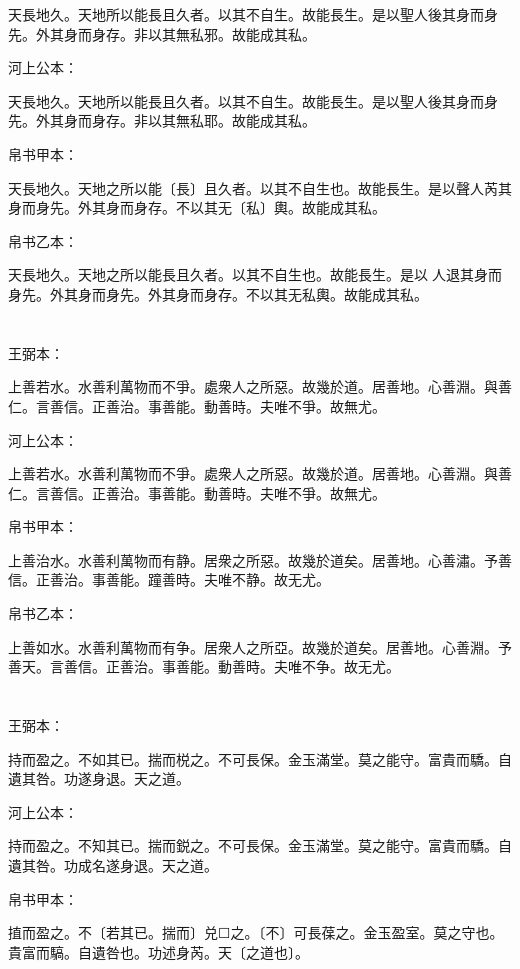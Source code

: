 \documentclass[a5paper]{ctexbook}
\begin{document}
    天長地久。天地所以能長且久者。以其不自生。故能長生。是以聖人後其身而身先。外其身而身存。非以其無私邪。故能成其私。

    河上公本：

    天長地久。天地所以能長且久者。以其不自生。故能長生。是以聖人後其身而身先。外其身而身存。非以其無私耶。故能成其私。

    帛书甲本：

    天長地久。天地之所以能〔長〕且久者。以其不自生也。故能長生。是以聲人芮其身而身先。外其身而身存。不以其无〔私〕輿。故能成其私。

    帛书乙本：

    天長地久。天地之所以能長且久者。以其不自生也。故能長生。是以𦔻人退其身而身先。外其身而身先。外其身而身存。不以其无私輿。故能成其私。

    \chapter{}
    王弼本：

    上善若水。水善利萬物而不爭。處衆人之所惡。故幾於道。居善地。心善淵。與善仁。言善信。正善治。事善能。動善時。夫唯不爭。故無尤。

    河上公本：

    上善若水。水善利萬物而不爭。處衆人之所惡。故幾於道。居善地。心善淵。與善仁。言善信。正善治。事善能。動善時。夫唯不爭。故無尤。

    帛书甲本：

    上善治水。水善利萬物而有静。居衆之所惡。故幾於道矣。居善地。心善潚。予善信。正善治。事善能。蹱善時。夫唯不静。故无尤。

    帛书乙本：

    上善如水。水善利萬物而有争。居衆人之所亞。故幾於道矣。居善地。心善淵。予善天。言善信。正善治。事善能。動善時。夫唯不争。故无尤。

    \chapter{}
    王弼本：

    持而盈之。不如其已。揣而棁之。不可長保。金玉滿堂。莫之能守。富貴而驕。自遺其咎。功遂身退。天之道。

    河上公本：

    持而盈之。不知其已。揣而鋭之。不可長保。金玉滿堂。莫之能守。富貴而驕。自遺其咎。功成名遂身退。天之道。

    帛书甲本：

    㨁而盈之。不〔若其已。揣而〕兑☐之。〔不〕可長葆之。金玉盈室。莫之守也。貴富而䮦。自遺咎也。功述身芮。天〔之道也〕。
\end{document}
